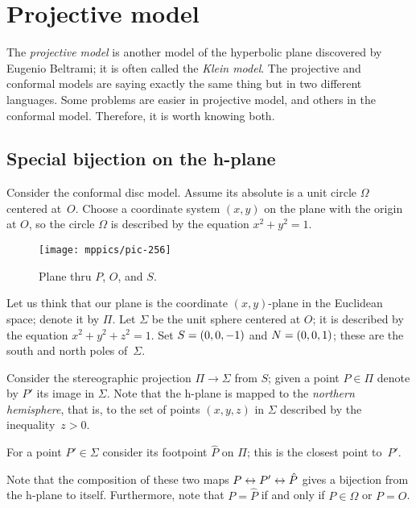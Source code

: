 \chapter{Projective model}\label{chap:klein}

The \textit{projective model} is another model of the hyperbolic plane discovered by Eugenio Beltrami; it is often called the {}\emph{Klein model}.
The projective and conformal models are saying exactly the same thing but in two different languages.
Some problems  are easier in projective model, and others in the conformal model.
Therefore, it is worth knowing both. 

\section{Special bijection on the h-plane}
\label{sec:special-bijection}

Consider the conformal disc model.
Assume its absolute is a unit circle $\Omega$ centered at~$O$.
Choose a coordinate system $(x,y)$ on the plane with the origin at $O$, 
so the circle $\Omega$ is described by the equation $x^2+y^2=1$.


\label{pic:stereographic_projection-klein}
\begin{wrapfigure}{o}{48mm}
\centering
\vskip-3mm
\texttt{[image: mppics/pic-256]}
\caption*{Plane thru $P$, $O$, and $S$.}
\vskip-3mm
\end{wrapfigure}

Let us think that our plane is the coordinate $(x,y)$-plane in the Euclidean space; denote it by $\Pi$.
Let $\Sigma$ be the unit sphere centered at $O$;
it is described by the equation 
$x^2+y^2+z^2=1$.
Set $S=(0,0,-1)$ and $N=(0,0,1)$; 
these are the south and north poles of~$\Sigma$.

Consider the stereographic projection $\Pi\to\Sigma$ from $S$;
given a point $P\in\Pi$ denote by $P'$ its image in $\Sigma$.
Note that the  h-plane is mapped to the {}\emph{northern hemisphere},
that is, to the set of points $(x,y,z)$ in $\Sigma$ described by the inequality~$z>0$.

For a point $P'\in \Sigma$ consider its footpoint $\hat P$
on $\Pi$;
this is the closest point to~$P'$.

Note that the composition of these two maps $P\leftrightarrow P'\leftrightarrow\hat P$
gives a bijection from the h-plane to itself.
Furthermore, note that $P=\hat P$
 if and only if  $P\in \Omega$ or $P=O$.


